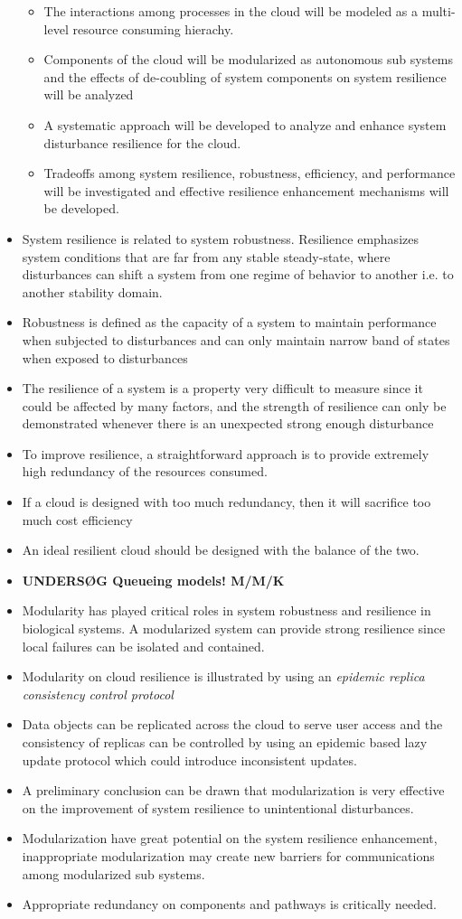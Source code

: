 \begin{itemize}
\begin{itemize}
		\item The interactions among processes in the cloud will be modeled as a multi-level resource consuming hierachy.
		\item Components of the cloud will be modularized as autonomous sub systems and the effects of de-coubling  of system components on system resilience will be analyzed
		\item A systematic approach will be developed to analyze and enhance system disturbance resilience for the cloud.
		\item Tradeoffs among system resilience, robustness, efficiency, and performance will be investigated and effective resilience enhancement mechanisms will be developed.
	\end{itemize}
	\item System resilience is related to system robustness. Resilience emphasizes system conditions that are far from any stable steady-state, where disturbances can shift a system from one regime of behavior to another i.e. to another stability domain.
	\item Robustness is defined as the capacity of a system to maintain performance when subjected to disturbances and can only maintain narrow band of states when exposed to disturbances
	\item The resilience of a system is a property very difficult to measure since it could be affected by many factors, and the strength of resilience can only be demonstrated whenever there is an unexpected strong enough disturbance
	\item To improve resilience, a straightforward approach is to provide extremely high redundancy of the resources consumed.
	\item If a cloud is designed with too much redundancy, then it will sacrifice too much cost efficiency
	\item An ideal resilient cloud should be designed with the balance of the two.
	\item \textbf{UNDERSØG Queueing models! M/M/K} 
	\item Modularity has played critical roles in system robustness and resilience in biological systems. A modularized system can provide strong resilience since local failures can be isolated and contained.
	\item Modularity on cloud resilience is illustrated by using an \textit{epidemic replica consistency control protocol}
	\item Data objects can be replicated across the cloud to serve user access and the consistency of replicas can be controlled by using an epidemic based lazy update protocol which could introduce inconsistent updates.
	\item A preliminary conclusion can be drawn that modularization is very effective on the improvement of system resilience to unintentional disturbances.
	\item Modularization have great potential on the system resilience enhancement, inappropriate modularization may create new barriers for communications among modularized sub systems.
	\item Appropriate redundancy on components and pathways is critically needed.
\end{itemize}